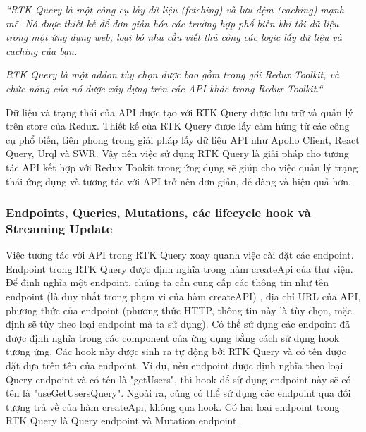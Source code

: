 \textit{“RTK Query là một công cụ lấy dữ liệu (fetching) và lưu đệm (caching) mạnh mẽ.
Nó được thiết kế để đơn giản hóa các trường hợp phổ biến khi tải dữ liệu trong một ứng dụng web, loại bỏ nhu cầu viết thủ công các logic lấy dữ liệu và caching của bạn.}
\par

\textit{RTK Query là một addon tùy chọn được bao gồm trong gói Redux Toolkit, và chức năng của nó được xây dựng trên các API khác trong Redux Toolkit.“} \cite{chap4bib2}
\par

Dữ liệu và trạng thái của API được tạo với RTK Query được lưu trữ và quản lý trên store của Redux.
Thiết kế của RTK Query được lấy cảm hứng từ các công cụ phổ biến, tiên phong trong giải pháp lấy dữ liệu API như Apollo Client, React Query, Urql và SWR.
Vậy nên việc sử dụng RTK Query là giải pháp cho tương tác API kết hợp với Redux Tookit trong ứng dụng sẽ giúp cho việc quản lý trạng thái ứng dụng và tương tác với API trở nên đơn giản, dễ dàng và hiệu quả hơn.

\subsubsection{Endpoints, Queries, Mutations, các lifecycle hook và Streaming Update}

\tab Việc tương tác với API trong RTK Query xoay quanh việc cài đặt các endpoint.
Endpoint trong RTK Query được định nghĩa trong hàm createApi của thư viện.
Để định nghĩa một endpoint, chúng ta cần cung cấp các thông tin như tên endpoint (là duy nhất trong phạm vi của hàm createAPI) , địa chỉ URL của API, phương thức của endpoint (phương thức HTTP, thông tin này là tùy chọn, mặc định sẽ tùy theo loại endpoint mà ta sử dụng). 
Có thể sử dụng các endpoint đã được định nghĩa trong các component của ứng dụng bằng cách sử dụng hook tương ứng.
Các hook này được sinh ra tự động bởi RTK Query và có tên được đặt dựa trên tên của endpoint.
Ví dụ, nếu endpoint được định nghĩa theo loại Query endpoint và có tên là "getUsers", thì hook để sử dụng endpoint này sẽ có tên là "useGetUsersQuery".
Ngoài ra, cũng có thể sử dụng các endpoint  qua đối tượng trả về của hàm createApi, không qua hook.
Có hai loại endpoint trong RTK Query là Query endpoint và Mutation endpoint.

